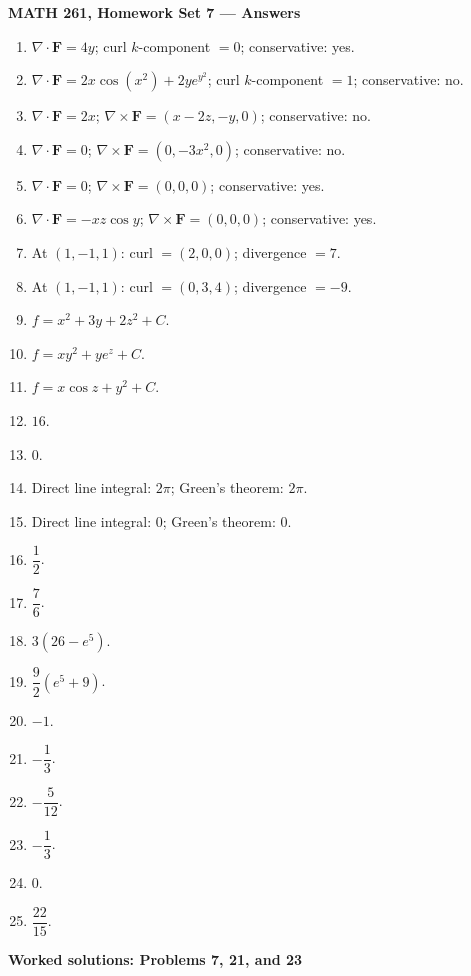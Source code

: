 \documentclass[12pt,letterpaper]{article}
\begin{document}
\textbf{MATH 261, Homework Set 7 --- Answers}

\small
\setlength{\abovedisplayskip}{6pt}
\setlength{\belowdisplayskip}{6pt}
\setlength{\abovedisplayshortskip}{3pt}
\setlength{\belowdisplayshortskip}{6pt}

\begin{enumerate}[leftmargin=*,itemsep=2pt,parsep=0pt,topsep=6pt]
\item $\nabla\cdot\mathbf F=4y$; curl $k$-component $=0$; conservative: yes.
\item $\nabla\cdot\mathbf F=2x\cos(x^2)+2ye^{y^2}$;
      curl $k$-component $=1$; conservative: no.
\item $\nabla\cdot\mathbf F=2x$;
      $\nabla\times\mathbf F=(x-2z,-y,0)$; conservative: no.
\item $\nabla\cdot\mathbf F=0$;
      $\nabla\times\mathbf F=(0,-3x^2,0)$; conservative: no.
\item $\nabla\cdot\mathbf F=0$;
      $\nabla\times\mathbf F=(0,0,0)$; conservative: yes.
\item $\nabla\cdot\mathbf F=-xz\cos y$;
      $\nabla\times\mathbf F=(0,0,0)$; conservative: yes.
\item At $(1,-1,1)$: curl $=(2,0,0)$; divergence $=7$.
\item At $(1,-1,1)$: curl $=(0,3,4)$; divergence $=-9$.
\item $f=x^2+3y+2z^2+C$.
\item $f=xy^2+ye^z+C$.
\item $f=x\cos z+y^2+C$.
\item $16$.
\item $0$.
\item Direct line integral: $2\pi$; Green's theorem: $2\pi$.
\item Direct line integral: $0$; Green's theorem: $0$.
\item $\dfrac12$.
\item $\dfrac76$.
\item $3(26-e^5)$.
\item $\dfrac92(e^5+9)$.
\item $-1$.
\item $-\dfrac13$.
\item $-\dfrac5{12}$.
\item $-\dfrac13$.
\item $0$.
\item $\dfrac{22}{15}$.
\end{enumerate}

\newpage
\textbf{Worked solutions: Problems 7, 21, and 23}
\end{document}
